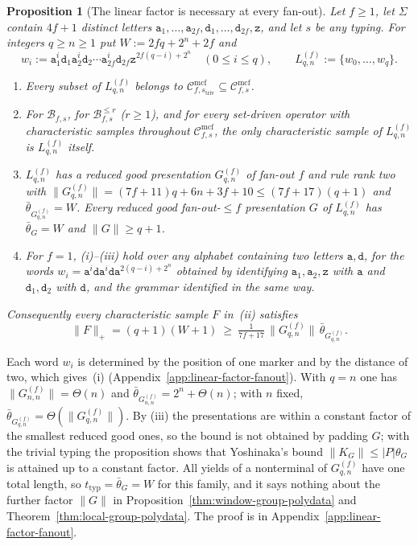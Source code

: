 \documentclass[11pt]{article}
\numberwithin{equation}{section}
\theoremstyle{plain}
\newtheorem{proposition}[theorem]{Proposition}
\theoremstyle{definition}
\theoremstyle{remark}
\newcommand{\Cmcf}[2]{\mathcal{C}^{\mathrm{mcf}}_{#1,#2}}
\theoremstyle{plain}
\begin{document}
\begin{proposition}[The linear factor is necessary at every fan-out]
\label{prop:linear-factor-all-fanout}
Let $f\ge1$, let $\Sigma$ contain $4f+1$ distinct letters
$\mathtt a_1,\ldots,\mathtt a_{2f},\mathtt d_1,\ldots,\mathtt d_{2f},\mathtt z$, and let
$s$ be any typing.  For integers $q\ge n\ge1$ put $W:=2fq+2^n+2f$ and
\[
 w_i:=\mathtt a_1^i\mathtt d_1\mathtt a_2^i\mathtt d_2\cdots\mathtt a_{2f}^i\mathtt d_{2f}
 \mathtt z^{2f(q-i)+2^n}\quad(0\le i\le q),\qquad
 L^{(f)}_{q,n}:=\{w_0,\ldots,w_q\}.
\]
\begin{enumerate}[label=\textup{(\roman*)},leftmargin=*]
\item Every subset of $L^{(f)}_{q,n}$ belongs to
$\Cmcf{f}{s_{\mathrm{triv}}}\subseteq\Cmcf{f}{s}$.
\item For $\mathcal B_{f,s}$, for $\mathcal B^{\le r}_{f,s}$ \textup($r\ge1$\textup),
and for every set-driven operator with characteristic samples throughout
$\Cmcf{f}{s}$, the only characteristic sample of $L^{(f)}_{q,n}$ is
$L^{(f)}_{q,n}$ itself.
\item $L^{(f)}_{q,n}$ has a reduced good presentation $G^{(f)}_{q,n}$ of fan-out
$f$ and rule rank two with
$\|G^{(f)}_{q,n}\|=(7f+11)q+6n+3f+10\le(7f+17)(q+1)$ and
$\bar\theta_{G^{(f)}_{q,n}}=W$.  Every reduced good fan-out-$\le f$ presentation
$G$ of $L^{(f)}_{q,n}$ has $\bar\theta_G=W$ and $\|G\|\ge q+1$.
\item For $f=1$, \textup{(i)}--\textup{(iii)} hold over any alphabet containing two
letters $\mathtt a,\mathtt d$, for the words
$w_i=\mathtt a^i\mathtt d\mathtt a^i\mathtt d\mathtt a^{2(q-i)+2^n}$ obtained by
identifying $\mathtt a_1,\mathtt a_2,\mathtt z$ with $\mathtt a$ and
$\mathtt d_1,\mathtt d_2$ with $\mathtt d$, and the grammar identified in the same
way.
\end{enumerate}
Consequently every characteristic sample $F$ in~\textup{(ii)} satisfies
\[
 \|F\|_+=(q+1)(W+1)\ \ge\ \tfrac1{7f+17}\,\|G^{(f)}_{q,n}\|\,
 \bar\theta_{G^{(f)}_{q,n}}.
\]
\end{proposition}

Each word $w_i$ is determined by the position of one marker and by the
distance of two, which gives~(i) (Appendix~\ref{app:linear-factor-fanout}).  With $q=n$ one has $\|G^{(f)}_{n,n}\|=\Theta(n)$ and
$\bar\theta_{G^{(f)}_{n,n}}=2^n+\Theta(n)$; with $n$ fixed,
$\bar\theta_{G^{(f)}_{q,n}}=\Theta(\|G^{(f)}_{q,n}\|)$.  By (iii) the presentations
are within a constant factor of the smallest reduced good ones, so the bound is
not obtained by padding $G$; with the trivial typing the proposition shows that
Yoshinaka's bound $\|K_G\|\le|P|\theta_G$ is attained up to a constant factor.
All yields of a nonterminal of $G^{(f)}_{q,n}$ have one total length, so
$t_{\mathrm{typ}}=\bar\theta_G=W$ for this family, and it says nothing about the
further factor $\|G\|$ in Proposition~\ref{thm:window-group-polydata} and
Theorem~\ref{thm:local-group-polydata}.  The proof is in
Appendix~\ref{app:linear-factor-fanout}.
\end{document}
